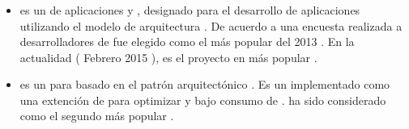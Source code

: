 	\subsubsection{\frameworksPC}
		\begin{itemize}

			\item
				\textbf{\laravelNAME} es un \frameworkPC de aplicaciones \webINT \phpNAME \freePC y \openSourcePC, designado para el desarrollo de aplicaciones \webINT utilizando el modelo de arquitectura \mvcAS. De acuerdo a una encuesta realizada a desarrolladores de \phpNAME \laravelNAME fue elegido como el \frameworkPC \phpNAME más popular del 2013 \cite{online_sitepoint_best_php_frameworks_2014}. En la actualidad ( Febrero 2015 ), \laravelNAME es el proyecto \phpNAME en \gitHubNAME más popular \cite{online_popularity_php_proyects}.
			\item
				\textbf{\phalconNAME} es un \frameworkPC \webINT para \phpNAME \highPerformanceQA basado en el patrón arquitectónico \mvcAS. Es un \frameworkPC \openSourcePC implementado como una extención de \cNAME para optimizar \performanceQA y bajo consumo de \resourcesCPT \cite{online_technology_officialsite_phalcon}. \phalconNAME ha sido considerado como el segundo \frameworkPC \phpNAME más popular \cite{online_popularity_php_proyects}.


\end{itemize}
